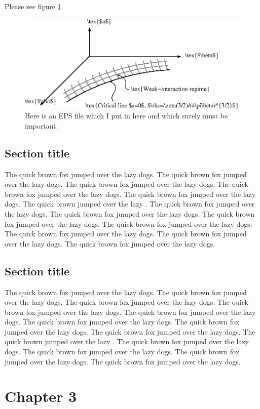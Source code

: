 Please see figure \ref{fig:important}.

\begin{figure}[!htb]
\begin{center}
\psfragscanon
\includegraphics{figures/critical_manifold.eps}
\caption[Short caption for the list of figures.]
	{Here is an EPS file which I put in here and which surely must be
	important.
	\label{fig:important}}
\end{center}
\end{figure}

\section{Section title}
\label{sec:yet_another_section}

The quick brown fox jumped over the lazy dogs.
The quick brown fox jumped over the lazy dogs.
The quick brown fox jumped over the lazy dogs.
The quick brown fox jumped over the lazy dogs.
The quick brown fox jumped over the lazy dogs.
The quick brown  jumped over the lazy .
The quick brown fox jumped over the lazy dogs.
The quick brown fox jumped over the lazy dogs.
The quick brown fox jumped over the lazy dogs.
The quick brown fox jumped over the lazy dogs.
The quick brown fox jumped over the lazy dogs.
The quick brown fox jumped over the lazy dogs.
The quick brown fox jumped over the lazy dogs.

\section{Section title}
\label{sec:last_section}

The quick brown fox jumped over the lazy dogs.
The quick brown fox jumped over the lazy dogs.
The quick brown fox jumped over the lazy dogs.
The quick brown fox jumped over the lazy dogs.
The quick brown fox jumped over the lazy dogs.
The quick brown fox jumped over the lazy dogs.
The quick brown fox jumped over the lazy dogs.
The quick brown fox jumped over the lazy dogs.
The quick brown  jumped over the lazy .
The quick brown fox jumped over the lazy dogs.
The quick brown fox jumped over the lazy dogs.
The quick brown fox jumped over the lazy dogs.
The quick brown fox jumped over the lazy dogs.


\chapter{Chapter 3}
\label{chap: chapter3}
